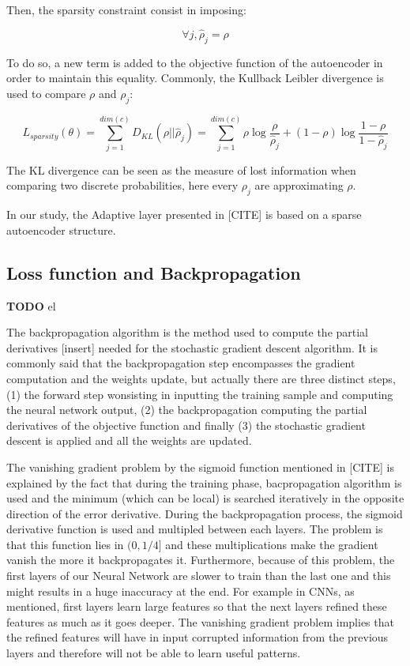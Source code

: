\documentclass[master,final,11pt]{iscs-thesis}
\begin{document}
Then, the sparsity constraint consist in imposing:

\[
\forall j,  \hat{\rho}_j = \rho
\]

To do so, a new term is added to the objective function of the autoencoder in order to maintain this equality. Commonly, the Kullback Leibler divergence is used to compare $\rho$ and $\rho_j$:

\[
L_{sparsity}(\theta) = \sum_{j=1}^{dim(c)}{D_{KL}(\rho||\hat{\rho}_j)} = \sum_{j=1}^{dim(c)}{\rho\log \frac{\rho}{\hat{\rho}_j}} + (1-\rho)\log \frac{1-\rho}{1-\hat{\rho}_j}
\]

The KL divergence can be seen as the measure of lost information when comparing two discrete probabilities, here every $\rho_j$ are approximating $\rho$.

In our study, the Adaptive layer presented in [CITE] is based on a sparse autoencoder structure.


\subsection{Loss function and Backpropagation}

\textbf{TODO} el

The backpropagation algorithm \cite{BACKPROP} is the method used to compute the partial derivatives [insert] needed for the stochastic gradient descent algorithm. It is commonly said that the backpropagation step encompasses the gradient computation and the weights update, but actually there are three distinct steps, (1) the forward step wonsisting in inputting the training sample and computing the neural network output, (2) the backpropagation computing the partial derivatives of the objective function and finally (3) the stochastic gradient descent is applied and all the weights are updated.

The vanishing gradient problem by the sigmoid function mentioned in [CITE] is explained by the fact that during the training phase, bacpropagation algorithm is used and the minimum (which can be local) is searched iteratively in the opposite direction of the error derivative. During the backpropagation process, the sigmoid derivative function is used and multipled between each layers. The problem is that this function lies in $(0, 1/4]$ and these multiplications make the gradient vanish the more it backpropagates it.
Furthermore, because of this problem, the first layers of our Neural Network are slower to train than the last one and this might results in a huge inaccuracy at the end. For example in CNNs, as mentioned, first layers learn large features so that the next layers refined these features as much as it goes deeper. The vanishing gradient problem implies that the refined features will have in input corrupted information from the previous layers and therefore will not be able to learn useful patterns.
\end{document}

